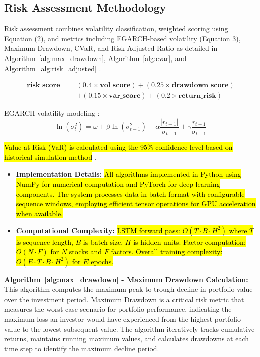 \documentclass[3p,times,procedia]{elsarticle}
\begin{document}
\subsection{Risk Assessment Methodology}
\vspace{-2pt}
Risk assessment combines volatility classification, weighted scoring using Equation (2), and metrics including EGARCH-based volatility (Equation 3), Maximum Drawdown, CVaR, and Risk-Adjusted Ratio as detailed in Algorithm~\ref{alg:max_drawdown}, Algorithm~\ref{alg:cvar}, and Algorithm~\ref{alg:risk_adjusted} \cite{Jorion2001,Rockafellar2000}.

\begin{align}
\mathbf{risk\_score} =\ & (0.4 \times \mathbf{vol\_score}) + (0.25 \times \mathbf{drawdown\_score}) \nonumber \\
& + (0.15 \times \mathbf{var\_score}) + (0.2 \times \mathbf{return\_risk})
\end{align}

EGARCH volatility modeling \cite{Nelson1991}:
\begin{equation}
\ln(\sigma_t^2) = \omega + \beta \ln(\sigma_{t-1}^2) + \alpha \frac{|r_{t-1}|}{\sigma_{t-1}} + \gamma \frac{r_{t-1}}{\sigma_{t-1}}
\end{equation}

\hl{Value at Risk (VaR) is calculated using the 95\% confidence level based on historical simulation method} \cite{Jorion2001}.

\begin{itemize}\setlength{\itemsep}{2pt}
\item \textbf{Implementation Details:} \hl{All algorithms implemented in Python using NumPy for numerical computation and PyTorch for deep learning components. The system processes data in batch format with configurable sequence windows, employing efficient tensor operations for GPU acceleration when available.}

\item \textbf{Computational Complexity:} \hl{LSTM forward pass: $O(T \cdot B \cdot H^2)$ where $T$ is sequence length, $B$ is batch size, $H$ is hidden units. Factor computation: $O(N \cdot F)$ for $N$ stocks and $F$ factors. Overall training complexity: $O(E \cdot T \cdot B \cdot H^2)$ for $E$ epochs.}
\end{itemize}

\textbf{Algorithm~\ref{alg:max_drawdown} - Maximum Drawdown Calculation:} This algorithm computes the maximum peak-to-trough decline in portfolio value over the investment period. Maximum Drawdown is a critical risk metric that measures the worst-case scenario for portfolio performance, indicating the maximum loss an investor would have experienced from the highest portfolio value to the lowest subsequent value. The algorithm iteratively tracks cumulative returns, maintains running maximum values, and calculates drawdowns at each time step to identify the maximum decline period.
\end{document}
